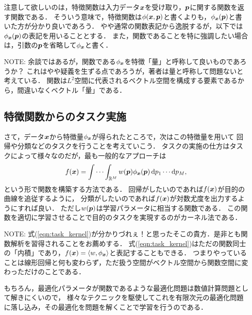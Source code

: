 注意して欲しいのは，特徴関数は入力データ$\boldsymbol{x}$を受け取り，$\boldsymbol{p}$に関する関数を返す関数である．
そういう意味で，特徴関数は$\phi(\boldsymbol{x}, \boldsymbol{p})$と書くよりも，$\phi_{\boldsymbol{x}}(\boldsymbol{p})$と書いた方が分かり良いであろう．
やや通常の関数表記から逸脱するが，以下では$\phi_{\boldsymbol{x}}(\boldsymbol{p})$の表記を用いることとする．
また，関数であることを特に強調したい場合は，引数の$\boldsymbol{p}$を省略して$\phi_{\boldsymbol{x}}$と書く．

\begin{displayquote}\footnotesize\textsf{NOTE:}
余談ではあるが，関数である$\phi_{\boldsymbol{x}}$を特徴「量」と呼称して良いものであろうか？
これはやや疑義を生ずる点であろうが，著者は量と呼称して問題ないと考えている．
関数は$L^2$空間に代表されるベクトル空間を構成する要素であるから，間違いなくベクトル「量」である．
\end{displayquote}

\subsection{特徴関数からのタスク実施}

さて，データ$\boldsymbol{x}$から特徴量$\phi_{\boldsymbol{x}}$が得られたところで，次はこの特徴量を用いて
回帰や分類などのタスクを行うことを考えていこう．
タスクの実施の仕方はタスクによって様々なのだが，最も一般的なアプローチは
\begin{equation}
    f(\boldsymbol{x}) = \idotsint_{\mathbb{R}^M} w(\boldsymbol{p}) \phi_{\boldsymbol{x}}(\boldsymbol{p}) \, 
    \mathrm{d}p_1 \cdots \mathrm{d}p_M,
    \label{eqn:task_kernel}
\end{equation}
という形で関数を構築する方法である．
回帰がしたいのであれば$f(\boldsymbol{x})$が目的の曲線を追従するように，
分類がしたいのであれば$f(\boldsymbol{x})$が対数尤度を出力するようにすれば良い．
ただし$w(\boldsymbol{p})$は学習パラメータに相当する関数である．
この関数を適切に学習させることで目的のタスクを実現するのがカーネル法である．

\begin{displayquote}\footnotesize\textsf{NOTE:}
式(\ref{eqn:task_kernel})が分かりづれぇ！と思ったそこの貴方．是非とも関数解析を習得されることをお薦めする．
式(\ref{eqn:task_kernel})はただの関数同士の「内積」であり，$f(\boldsymbol{x}) = \langle w, \phi_{\boldsymbol{x}} \rangle$と表記することもできる．
つまりやっていることは線形回帰と何も変わらず，ただ扱う空間がベクトル空間から関数空間に変わっただけのことである．
\end{displayquote}

もちろん，最適化パラメータが関数であるような最適化問題は数値計算問題として解きにくいので，
様々なテクニックを駆使してこれを有限次元の最適化問題に落し込み，その最適化を問題を解くことで学習を行うのである．

